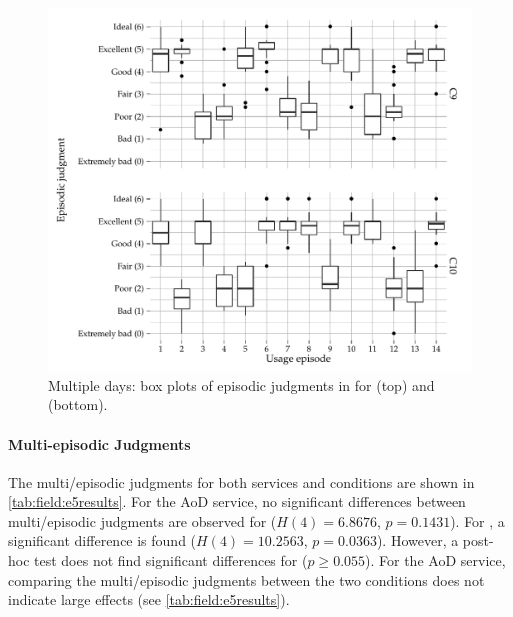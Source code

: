 \begin{figure}[t]
	\centering
\begin{knitrout}
\color{fgcolor}
\includegraphics[width=\maxwidth]{figure/plotE5-1} 

\end{knitrout}
	\caption[Multiple days (): box plots of episodic judgments for  and \CX{}]{Multiple days: box plots of episodic judgments in  for  (top) and \CX{} (bottom).}
	\label{img:field:boxplotE5}
\end{figure}

\paragraph*{Multi-episodic Judgments}
The multi\-/episodic judgments for both services and conditions are shown in \autoref{tab:field:e5results}.
For the \ac{AoD} service, no significant differences between multi\-/episodic judgments are observed for  ($H(4)=6.8676$, $p=0.1431$).
For \CX{}, a significant difference is found ($H(4)=10.2563$, $p=0.0363$).
However, a post-hoc test does not find significant differences for \CX{} ($p\geq0.055$). %
For the \ac{AoD} service, comparing the multi\-/episodic judgments between the two conditions does not indicate large effects (see \autoref{tab:field:e5results}).

